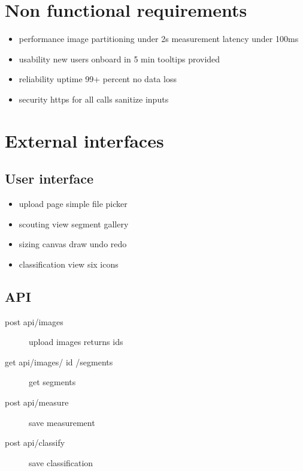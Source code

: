 \documentclass{article}
\begin{document}
\section{Non functional requirements}
\begin{itemize}
\item performance image partitioning under 2s measurement latency under 100ms
\item usability new users onboard in 5 min tooltips provided
\item reliability uptime 99+ percent no data loss
\item security https for all calls sanitize inputs
\end{itemize}

\section{External interfaces}
\subsection{User interface}
\begin{itemize}
\item upload page simple file picker
\item scouting view segment gallery
\item sizing canvas draw undo redo
\item classification view six icons
\end{itemize}

\subsection{API}
\begin{description}
\item[post api/images] upload images returns ids
\item[get api/images/ id /segments] get segments
\item[post api/measure] save measurement
\item[post api/classify] save classification
\end{description}
\end{document}
